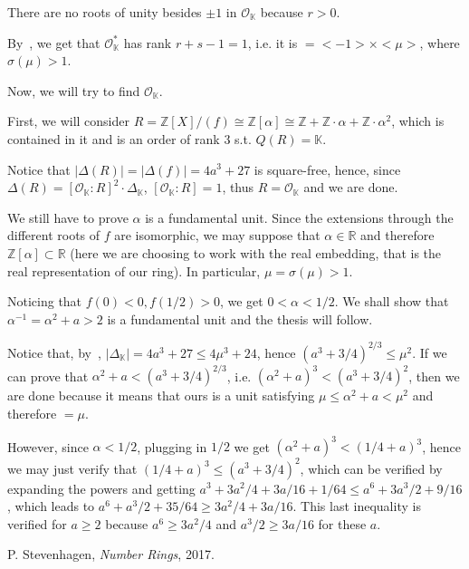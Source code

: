\documentclass{article}
\newcommand{\numberset}{\mathbb}
\newcommand{\Z}{\numberset{Z}}
\newcommand{\R}{\numberset{R}}
\newcommand{\K}{\numberset{K}}
\begin{document}
There are no roots of unity besides $\pm 1$ in $\mathcal{O}_{\K}$ because $r>0$.

By~\cite[thm. 5.13]{stev}, we get that $\mathcal{O}^*_{\K}$ has rank $r+s-1=1$, i.e. it is $=<-1>\times<\mu>$, where $\sigma(\mu)>1$.

Now, we will try to find $\mathcal{O}_{\K}$.

First, we will consider $R=\Z[X]/(f)\cong\Z[\alpha]\cong\Z+\Z\cdot\alpha+\Z\cdot\alpha^2$, which is contained in it and is an order of rank 3 s.t. $Q(R)=\K$.

Notice that $|\Delta(R)|=|\Delta(f)|=4a^3+27$ is square-free, hence, since $\Delta(R)=[\mathcal{O}_{\K}:R]^2\cdot\Delta_{\K}$, $[\mathcal{O}_{\K}:R]=1$, thus $R=\mathcal{O}_{\K}$ and we are done.

We still have to prove $\alpha$ is a fundamental unit. Since the extensions through the different roots of $f$ are isomorphic, we may suppose that $\alpha\in\R$ and therefore $\Z[\alpha]\subset\R$ (here we are choosing to work with the real embedding, that is the real representation of our ring). In particular, $\mu=\sigma(\mu)>1$.

Noticing that $f(0)<0,f(1/2)>0$, we get $0<\alpha<1/2$. We shall show that $\alpha^{-1}=\alpha^2+a>2$ is a fundamental unit and the thesis will follow.

Notice that, by~\cite[ex. 21]{stev}, $|\Delta_{\K}|=4a^3+27\leq 4\mu^3+24$, hence $(a^3+3/4)^{2/3}\leq\mu^2$. If we can prove that $\alpha^2+a<(a^3+3/4)^{2/3}$, i.e. $(\alpha^2+a)^3<(a^3+3/4)^2$, then we are done because it means that ours is a unit satisfying $\mu\leq\alpha^2+a<\mu^2$ and therefore $=\mu$.

However, since $\alpha<1/2$, plugging in $1/2$ we get $(\alpha^2+a)^3<(1/4+a)^3$, hence we may just verify that $(1/4+a)^3\leq(a^3+3/4)^2$, which can be verified by expanding the powers and getting $a^3+3a^2/4+3a/16+1/64\leq a^6+3a^3/2+9/16$, which leads to $a^6+a^3/2+35/64\geq 3a^2/4+3a/16$. This last inequality is verified for $a\geq2$ because $a^6\geq 3a^2/4$ and $a^3/2\geq 3a/16$ for these $a$.


\begin{thebibliography}{9}
		P. Stevenhagen,
		\textit{Number Rings},
		2017.
\end{thebibliography}
\end{document}
